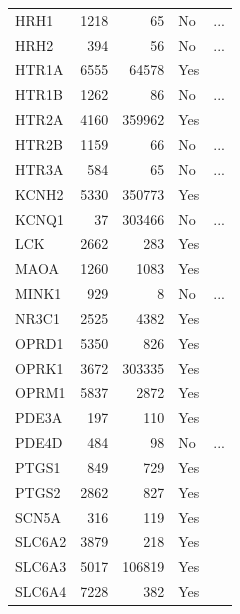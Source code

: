 \documentclass[utf8]{frontiersSCNS} %
\begin{document}
\begin{table}[]
\begin{tabular}{|l|r|r|l|l|}
    HRH1    &       1218    &       65          &   No      &       ...     \\
    HRH2    &       394     &       56          &   No      &       ...     \\
    HTR1A   &       6555    &       64578       &   Yes     &       \\
    HTR1B   &       1262    &       86          &   No      &       ...     \\
    HTR2A   &       4160    &       359962      &   Yes     &       \\
    HTR2B   &       1159    &       66          &   No      &       ...     \\
    HTR3A   &       584     &       65          &   No      &       ...     \\
    KCNH2   &       5330    &       350773      &   Yes     &       \\
    KCNQ1   &       37      &       303466      &   No      &       ...     \\
    LCK     &       2662    &       283         &   Yes     &       \\
    MAOA    &       1260    &       1083        &   Yes     &       \\
    MINK1   &       929     &       8           &   No      &       ...     \\
    NR3C1   &       2525    &       4382        &   Yes     &       \\
    OPRD1   &       5350    &       826         &   Yes     &       \\
    OPRK1   &       3672    &       303335      &   Yes     &       \\
    OPRM1   &       5837    &       2872        &   Yes     &       \\
    PDE3A   &       197     &       110         &   Yes     &       \\
    PDE4D   &       484     &       98          &   No      &       ...     \\
    PTGS1   &       849     &       729         &   Yes     &       \\
    PTGS2   &       2862    &       827         &   Yes     &       \\
    SCN5A   &       316     &       119         &   Yes     &       \\
    SLC6A2  &       3879    &       218         &   Yes     &       \\
    SLC6A3  &       5017    &       106819      &   Yes     &       \\
    SLC6A4  &       7228    &       382         &   Yes     &       \\
\hline
\end{tabular}
\end{table}
\end{document}
